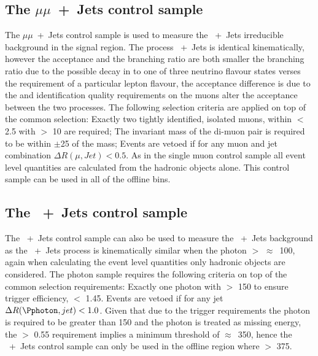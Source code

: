 \subsection{The $\mu\mu$~+~Jets control sample} %
\label{par:the_mumu_jets_control_sample}
The $\mu\mu$~+~Jets control sample is used to measure the 
\HepProcess{\PZ\to\nu\nu}~+~Jets irreducible background in the signal region. 
The process \HepProcess{\PZ\to\mu\mu}~+~Jets is identical kinematically, 
however the acceptance and the branching ratio are both smaller the branching 
ratio due to the possible decay in to one of three neutrino flavour states 
verses the requirement of a particular lepton flavour, the acceptance 
difference is due to the \PT and identification quality requirements on the 
muons alter the acceptance between the two processes. The following selection 
criteria are applied on top of the common selection: Exactly two tightly 
identified, isolated muons, within \mETA $<$ 2.5 with \PT $>$ \unit{10}{\GeV} 
are required; The invariant mass of the di-muon pair is required to be within 
$\pm$\unit{25}{\GeV} of the \PZ mass; Events are vetoed if for any muon and jet 
combination $\Delta R(\mu,Jet) < 0.5$. As in the single muon control sample all 
event level quantities are calculated from the hadronic objects alone. This 
control sample can be used in all of the offline \HT bins.

\subsection{The \Pphoton~+~Jets control sample} %
\label{par:the_pphoton_jets_control_sample}
The \Pphoton~+~Jets control sample can also be used to measure the 
\HepProcess{\PZ\to\nu\nu}~+~Jets background as the \Pphoton~+~Jets process is 
kinematically similar when the photon \ET $>$ 
$\approx$~\unit{100}{\GeV}\cite{PAS-SUS-08-002,Bern:2011pa}, again when 
calculating the event level quantities only hadronic objects are considered.
The photon sample requires the following criteria on top of the common 
selection requirements: Exactly one photon with \ET $>$ \unit{150}{\GeV} to 
ensure trigger efficiency, \mETA $<$ 1.45. Events are vetoed if for any jet 
$\Delta R(\Pphoton,jet) < 1.0$. Given that due to the trigger requirements the 
photon \ET is required to be greater than \unit{150}{\GeV} and the photon is 
treated as missing energy, the \alt $>$ 0.55 requirement implies a minimum \HT 
threshold of $\approx$~\unit{350}{\GeV}, hence the \Pphoton~+~Jets control 
sample can only be used in the offline region where \HT $>$ \unit{375}{\GeV}.

